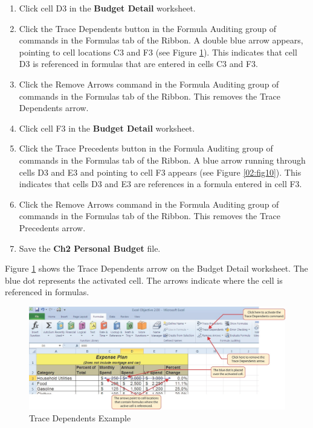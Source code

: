 \begin{enumerate}
	\item Click cell \textsf{D3} in the \textbf{Budget Detail} worksheet.
	\item Click the Trace Dependents button in the Formula Auditing group of commands in the Formulas tab of the Ribbon. A double blue arrow appears, pointing to cell locations \textsf{C3} and \textsf{F3} (see Figure \ref{02:fig09}). This indicates that cell \textsf{D3} is referenced in formulas that are entered in cells \textsf{C3} and \textsf{F3}.
	\item Click the Remove Arrows command in the Formula Auditing group of commands in the Formulas tab of the Ribbon. This removes the Trace Dependents arrow.
	\item Click cell \textsf{F3} in the \textbf{Budget Detail} worksheet.
	\item Click the Trace Precedents button in the Formula Auditing group of commands in the Formulas tab of the Ribbon. A blue arrow running through cells \textsf{D3} and \textsf{E3} and pointing to cell \textsf{F3} appears (see Figure \ref{02:fig10}). This indicates that cells \textsf{D3} and \textsf{E3} are references in a formula entered in cell \textsf{F3}.
	\item Click the Remove Arrows command in the Formula Auditing group of commands in the Formulas tab of the Ribbon. This removes the Trace Precedents arrow.
	\item Save the \textbf{Ch2 Personal Budget} file.
\end{enumerate}

Figure \ref{02:fig09} shows the Trace Dependents arrow on the Budget Detail worksheet. The blue dot represents the activated cell. The arrows indicate where the cell is referenced in formulas.

\begin{figure}[H]
	\centering
	\includegraphics[width=\maxwidth{.95\linewidth}]{gfx/ch02_fig09}
	\caption{Trace Dependents Example}
	\label{02:fig09}
\end{figure}

